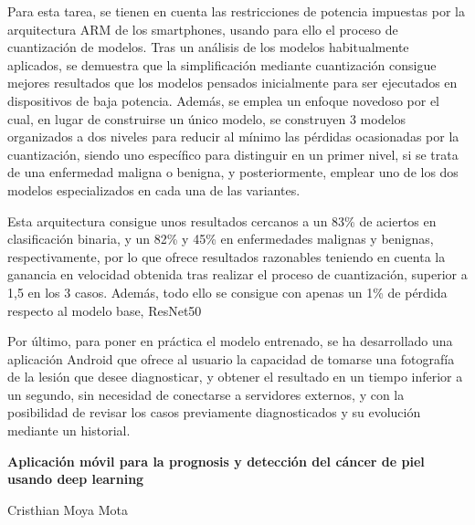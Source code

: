 Para esta tarea, se tienen en cuenta las restricciones de potencia impuestas por la arquitectura ARM de los smartphones, usando para ello el proceso de cuantización de modelos. Tras un análisis de los modelos habitualmente aplicados, se demuestra que la simplificación mediante cuantización consigue mejores resultados que los modelos pensados inicialmente para ser ejecutados en dispositivos de baja potencia. Además, se emplea un enfoque novedoso por el cual, en lugar de construirse un único modelo, se construyen 3 modelos organizados a dos niveles para reducir al mínimo las pérdidas ocasionadas por la cuantización, siendo uno específico para distinguir en un primer nivel, si se trata de una enfermedad maligna o benigna, y posteriormente, emplear uno de los dos modelos especializados en cada una de las variantes.

Esta arquitectura consigue unos resultados cercanos a un 83\% de aciertos en clasificación binaria, y un 82\%  y 45\% en enfermedades malignas y benignas, respectivamente, por lo que ofrece resultados razonables teniendo en cuenta la ganancia en velocidad obtenida tras realizar el proceso de cuantización, superior a 1,5 en los 3 casos. Además, todo ello se consigue con apenas un 1\% de pérdida respecto al modelo base, ResNet50~\cite{he2015deep}

Por último, para poner en práctica el modelo entrenado, se ha desarrollado una aplicación Android que ofrece al usuario la capacidad de tomarse una fotografía de la lesión que desee diagnosticar, y obtener el resultado en un tiempo inferior a un segundo, sin necesidad de conectarse a servidores externos, y con la posibilidad de revisar los casos previamente diagnosticados y su evolución mediante un historial. 

\cleardoublepage
\thispagestyle{empty}


\begin{center}
{\large\bfseries Aplicación móvil para la prognosis y detección del cáncer de piel usando deep learning}\\
\end{center}
\begin{center}
Cristhian Moya Mota\\
\end{center}

\\

